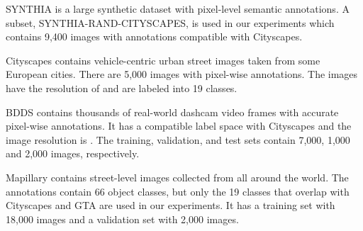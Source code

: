 \documentclass[10pt,twocolumn,letterpaper]{article}
\begin{document}
SYNTHIA is a large synthetic dataset with pixel-level semantic annotations. A subset, SYNTHIA-RAND-CITYSCAPES, is used in our experiments which contains 9,400 images with annotations compatible with Cityscapes.

Cityscapes contains vehicle-centric urban street images taken from some European cities. There are 5,000 images with pixel-wise annotations. The images have the resolution of  and are labeled into 19 classes.




BDDS contains thousands of real-world dashcam video frames with accurate pixel-wise annotations. It has a compatible label space with Cityscapes and the image resolution is . The training, validation, and test sets contain 7,000, 1,000 and 2,000 images, respectively.

Mapillary contains street-level images collected from all around the world.
The annotations contain 66 object classes, but only the 19 classes that overlap with Cityscapes and GTA are used in our experiments. It has a training set with 18,000 images and a validation set with 2,000 images. 
\label{para:experimental_setup}
\end{document}
